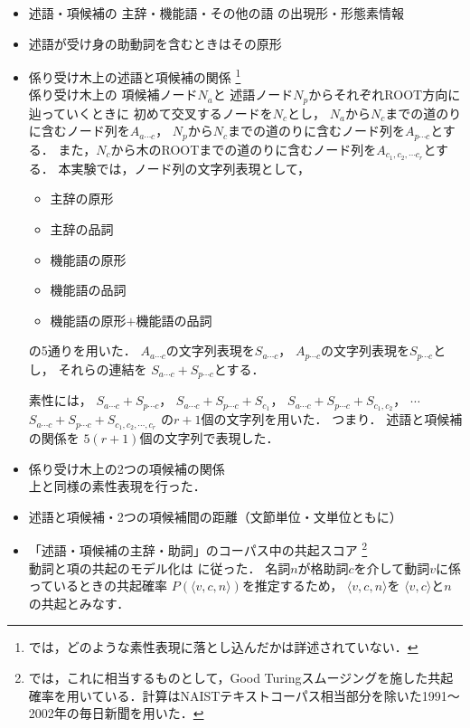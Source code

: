 \documentclass[japanese]{jnlp_1.4}
\begin{document}
\begin{itemize}
\item 述語・項候補の
主辞・機能語・その他の語
の出現形・形態素情報
\item 述語が受け身の助動詞を含むときはその原形
\item 係り受け木上の述語と項候補の関係
\footnote{では，どのような素性表現に落とし込んだかは詳述されていない．}\\
係り受け木上の
項候補ノード$N_a$と
述語ノード$N_p$からそれぞれROOT方向に辿っていくときに
初めて交叉するノードを$N_c$とし，
$N_a$から$N_c$までの道のりに含むノード列を$A_{a \cdots c}$，
$N_p$から$N_c$までの道のりに含むノード列を$A_{p \cdots c}$とする．
また，$N_c$から木のROOTまでの道のりに含むノード列を$A_{c_1, c_2, \cdots c_r}$とする．
本実験では，ノード列の文字列表現として，
\begin{itemize}
\item 主辞の原形
\item 主辞の品詞
\item 機能語の原形
\item 機能語の品詞
\item 機能語の原形$+$機能語の品詞
\end{itemize}
の5通りを用いた．
$A_{a \cdots c}$の文字列表現を$S_{a \cdots c}$，
$A_{p \cdots c}$の文字列表現を$S_{p \cdots c}$とし，
それらの連結を
$S_{a \cdots c} + S_{p \cdots c}$とする．

素性には，
$S_{a \cdots c} + S_{p \cdots c}$，
$S_{a \cdots c} + S_{p \cdots c} + S_{c_1}$，
$S_{a \cdots c} + S_{p \cdots c} + S_{c_1, c_2}$，
$\cdots$
$S_{a \cdots c} + S_{p \cdots c} + S_{c_1, c_2, \cdots, c_r}$
の$r+1$個の文字列を用いた．
つまり．
述語と項候補の関係を
$5(r+1)$個の文字列で表現した．
\item 係り受け木上の2つの項候補の関係\\
上と同様の素性表現を行った．
\item 述語と項候補・2つの項候補間の距離（文節単位・文単位ともに）
\item 「述語・項候補の主辞・助詞」のコーパス中の共起スコア
\footnote{では，これに相当するものとして，Good Turingスムージングを施した共起確率を用いている．計算はNAISTテキストコーパス相当部分を除いた1991〜2002年の毎日新聞を用いた．}\\
動詞と項の共起のモデル化は
\cite{Fujita:2004:IPSJ}に従った．
名詞$n$が格助詞$c$を介して動詞$v$に係っているときの共起確率
$P(\langle v, c, n\rangle )$を推定するため，
$\langle v, c, n\rangle$を
$\langle v, c\rangle$と$n$の共起とみなす．


\end{itemize}
\end{document}
